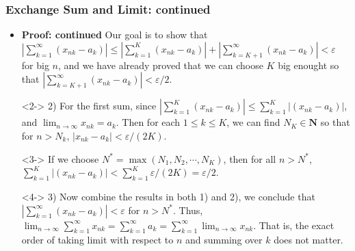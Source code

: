 \documentclass[handout]{beamer}
\begin{document}
\frame
{
  \frametitle{Exchange Sum and Limit: continued}

   \begin{itemize}
   
 
  \item<1-> \textbf{Proof: continued} Our goal is to show that $ |\sum_{k=1}^{\infty} ( x_{nk}- a_k)|  \leq |\sum_{k=1}^{K} ( x_{nk}- a_k) |+|\sum_{k=K+1}^{\infty} ( x_{nk}- a_k)| <\varepsilon $ for big $n$, and we have already proved that we can choose $K$ big enought so that $|\sum_{k=K+1}^{\infty} ( x_{nk}- a_k)|<\varepsilon/2$. 
  
  
     \item[]<2-> 2) For the first sum, since $ |\sum_{k=1}^{K} ( x_{nk}- a_k)| \leq  \sum_{k=1}^{K} |( x_{nk}- a_k)|$, and $\lim_{n\rightarrow \infty} x_{nk}=a_k$. Then for each $1\leq k\leq K$, we can find $N_K \in \mathbf{N}$ so that for $n>N_k$, $|x_{nk}-a_k|<\varepsilon/(2K)$.
     
       \item[]<3->  If we choose $N^*=\max(N_1,N_2,\cdots, N_K)$, then for all $n>N^*$, $\sum_{k=1}^{K} |( x_{nk}- a_k)|<\sum_{k=1}^K \varepsilon/(2K) =\varepsilon/2$.
     
       \item[]<4-> 3)  Now combine the results in both 1) and 2), we conclude that  $ |\sum_{k=1}^{\infty} ( x_{nk}- a_k)| <\varepsilon$ for $n>N^*$. Thus, $\lim_{n\rightarrow \infty } \sum_{k=1}^{\infty} x_{nk}=\sum_{k=1}^{\infty} a_k= \sum_{k=1}^{\infty} \lim_{n\rightarrow \infty } x_{nk}$. That is, the exact order of taking limit with respect to $n$ and summing over $k$ does not matter. 
        
       
  \end{itemize}
}
\end{document}
